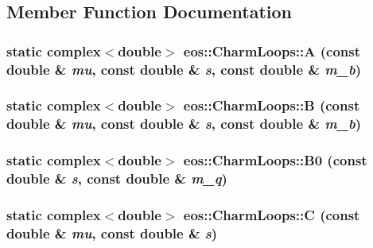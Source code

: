\subsection{Member Function Documentation}
\hypertarget{structeos_1_1CharmLoops_ab2fd582d0ba9c5b1181ff2e63c4f5f88}{
\subsubsection[{A}]{\setlength{\rightskip}{0pt plus 5cm}static complex$<$double$>$ eos::CharmLoops::A (const double \& {\em mu}, \/  const double \& {\em s}, \/  const double \& {\em m\_\-b})}}
\label{structeos_1_1CharmLoops_ab2fd582d0ba9c5b1181ff2e63c4f5f88}
\hypertarget{structeos_1_1CharmLoops_ad1599db67462adc30f33918fe774bfe3}{
\subsubsection[{B}]{\setlength{\rightskip}{0pt plus 5cm}static complex$<$double$>$ eos::CharmLoops::B (const double \& {\em mu}, \/  const double \& {\em s}, \/  const double \& {\em m\_\-b})}}
\label{structeos_1_1CharmLoops_ad1599db67462adc30f33918fe774bfe3}
\hypertarget{structeos_1_1CharmLoops_a12035607b29d252a6eab317c850255b7}{
\subsubsection[{B0}]{\setlength{\rightskip}{0pt plus 5cm}static complex$<$double$>$ eos::CharmLoops::B0 (const double \& {\em s}, \/  const double \& {\em m\_\-q})}}
\label{structeos_1_1CharmLoops_a12035607b29d252a6eab317c850255b7}
\hypertarget{structeos_1_1CharmLoops_a41ed4114fe8c4a25702232a9421b8e05}{
\subsubsection[{C}]{\setlength{\rightskip}{0pt plus 5cm}static complex$<$double$>$ eos::CharmLoops::C (const double \& {\em mu}, \/  const double \& {\em s})}}
